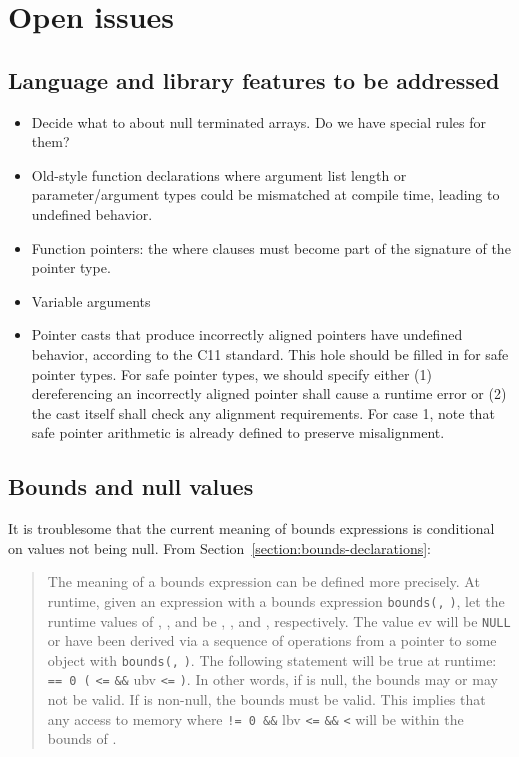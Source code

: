 \chapter{Open issues}
\label{chapter:open-issues}

\section{Language and library features to be addressed}\label{language-and-library-features-to-be-addressed}

\begin{itemize}
\item
  Decide what to about null terminated arrays. Do we have special rules
  for them?
\item
  Old-style function declarations where argument list length or
  parameter/argument types could be mismatched at compile time, leading
  to undefined behavior.
\item
  Function pointers: the where clauses must become part of the signature
  of the pointer type.
\item
  Variable arguments
\item
  Pointer casts that produce incorrectly aligned pointers have undefined
  behavior, according to the C11 standard. This hole should be filled in
  for safe pointer types. For safe pointer types, we should specify
  either (1) dereferencing an incorrectly aligned pointer shall cause a
  runtime error or (2) the cast itself shall check any alignment
  requirements. For case 1, note that safe pointer arithmetic is already
  defined to preserve misalignment.
\end{itemize}

\section{Bounds and null values}\label{bounds-and-null-values}

It is troublesome that the current meaning of bounds expressions is
conditional on values not being null. 
From Section~\ref{section:bounds-declarations}:

\begin{quote}
The meaning of a bounds expression can be defined more precisely. At
runtime, given an expression  with a bounds expression
\texttt{bounds(}\texttt{,} \texttt{)}, let the runtime
values of , , and  be , ,
and , respectively. The value ev will be \texttt{NULL} or have
been derived via a sequence of operations from a pointer to some object
 with \texttt{bounds(}\texttt{,}
\texttt{)}. The following statement will be true at runtime:
 \texttt{== 0 \textbar{}\textbar{} (}
\texttt{\textless{}=}  \texttt{\&\&} ubv \texttt{\textless{}=}
\texttt{)}. In other words, if  is null, the bounds
may or may not be valid. If  is non-null, the bounds must be
valid. This implies that any access to memory where  \texttt{!=
0 \&\&} lbv \texttt{\textless{}=}  \texttt{\&\&} 
\texttt{\textless{}}  will be within the bounds of .
\end{quote}

